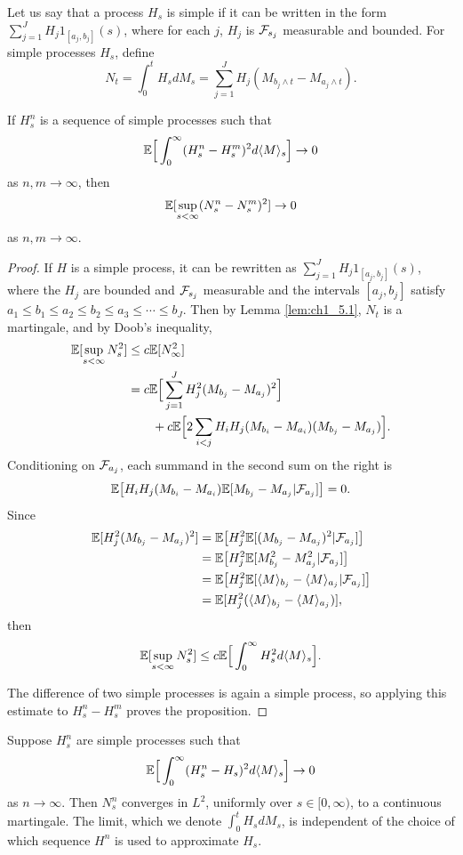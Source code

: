 Let us say that a process $H_s$ is simple if it can be written in the form $\sum_{j=1}^J H_j1_{[a_j,b_j]}(s)$, where for each $j$, $H_j$ is $\mathcal{F}_{s_j}$ measurable and bounded. For simple processes $H_s$, define
\[
    N_t = \int_0^t H_s dM_s = \sum_{j=1}^J H_j(M_{b_j \wedge t} - M_{a_j \wedge t}).
\]

\begin{proposition}\label{prop:ch1_5.2}
If $H_s^n$ is a sequence of simple processes such that
\[
    \mathbb{E}\Big[\int_0^\infty (H_s^n - H_s^m)^2d\langle M \rangle_s\Big] \to 0
\]
as $n,m \to \infty$, then
\[
    \mathbb{E}[\sup_{s<\infty}(N_s^n - N_s^m)^2] \to 0
\]
as $n,m \to \infty$.
\end{proposition}

\begin{proof}
If $H$ is a simple process, it can be rewritten as $\sum_{j=1}^J H_j1_{[a_j,b_j]}(s)$, where the $H_j$ are bounded and $\mathcal{F}_{s_j}$ measurable and the intervals $[a_j,b_j]$ satisfy $a_1 \leq b_1 \leq a_2 \leq b_2 \leq a_3 \leq \cdots \leq b_J$. Then by Lemma \ref{lem:ch1_5.1}, $N_t$ is a martingale, and by Doob's inequality,
\begin{align*}
    \mathbb{E}[\sup_{s<\infty} N_s^2] &\leq c\mathbb{E}[N_\infty^2] \\
    &= c\mathbb{E}\Big[\sum_{j=1}^J H_j^2(M_{b_j} - M_{a_j})^2\Big] \\
    &\qquad+ c\mathbb{E}\Big[2\sum_{i<j} H_i H_j(M_{b_i} - M_{a_i})(M_{b_j} - M_{a_j})\Big].
\end{align*}
Conditioning on $\mathcal{F}_{a_j}$, each summand in the second sum on the right is
\[
    \mathbb{E}\big[H_iH_j(M_{b_i}-M_{a_i})\mathbb{E}[M_{b_j}-M_{a_j}| \mathcal{F}_{a_j}]\big]=0.
\]
Since
\begin{align*}
    \mathbb{E}[H_j^2(M_{b_j} - M_{a_j})^2] &= \mathbb{E}\big[H_j^2\mathbb{E}[(M_{b_j} - M_{a_j})^2| \mathcal{F}_{a_j}]\big] \\
    &= \mathbb{E}\big[H_j^2\mathbb{E}[M_{b_j}^2 - M_{a_j}^2| \mathcal{F}_{a_j}]\big] \\
    &=\mathbb{E}\big[H_j^2\mathbb{E}[\langle M \rangle_{b_j} - \langle M \rangle_{a_j}| \mathcal{F}_{a_j}]\big] \\
    &= \mathbb{E}[H_j^2(\langle M \rangle_{b_j} - \langle M \rangle_{a_j})],
\end{align*}
\mnewpage
then
\[
    \mathbb{E}[\sup_{s<\infty} N_s^2] \leq c\mathbb{E}\Big[\int_0^\infty H_s^2d\langle M \rangle_s\Big].
\]

The difference of two simple processes is again a simple process, so applying this estimate to $H_s^n - H_s^m$ proves the proposition.
\end{proof}

\begin{theorem}\label{thm:ch1_5.3}
Suppose $H_s^n$ are simple processes such that
\[
    \mathbb{E}\Big[\int_0^\infty (H_s^n - H_s)^2d\langle M \rangle_s\Big] \to 0
\]
as $n \to \infty$. Then $N_s^n$ converges in $L^2$, uniformly over $s \in [0,\infty)$, to a continuous martingale. The limit, which we denote $\int_0^t H_s dM_s$, is independent of the choice of which sequence $H^n$ is used to approximate $H_s$.
\end{theorem}

